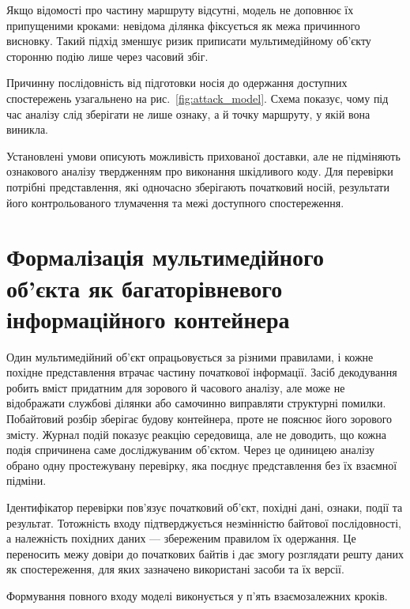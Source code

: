 Якщо відомості про частину маршруту відсутні, модель не доповнює їх припущеними кроками: невідома ділянка фіксується як межа причинного висновку. Такий підхід зменшує ризик приписати мультимедійному об’єкту сторонню подію лише через часовий збіг.

Причинну послідовність від підготовки носія до одержання доступних спостережень узагальнено на рис.~\ref{fig:attack_model}. Схема показує, чому під час аналізу слід зберігати не лише ознаку, а й точку маршруту, у якій вона виникла.



Установлені умови описують можливість прихованої доставки, але не підміняють ознакового аналізу твердженням про виконання шкідливого коду. Для перевірки потрібні представлення, які одночасно зберігають початковий носій, результати його контрольованого тлумачення та межі доступного спостереження.

\section{Формалізація мультимедійного об’єкта як багаторівневого інформаційного контейнера}
\label{sec:multilevel_container}

Один мультимедійний об’єкт опрацьовується за різними правилами, і кожне похідне представлення втрачає частину початкової інформації. Засіб декодування робить вміст придатним для зорового й часового аналізу, але може не відображати службові ділянки або самочинно виправляти структурні помилки. Побайтовий розбір зберігає будову контейнера, проте не пояснює його зорового змісту. Журнал подій показує реакцію середовища, але не доводить, що кожна подія спричинена саме досліджуваним об’єктом. Через це одиницею аналізу обрано одну простежувану перевірку, яка поєднує представлення без їх взаємної підміни.

Ідентифікатор перевірки пов’язує початковий об’єкт, похідні дані, ознаки, події та результат. Тотожність входу підтверджується незмінністю байтової послідовності, а належність похідних даних --- збереженим правилом їх одержання. Це переносить межу довіри до початкових байтів і дає змогу розглядати решту даних як спостереження, для яких зазначено використані засоби та їх версії.

Формування повного входу моделі виконується у п’ять взаємозалежних кроків.

